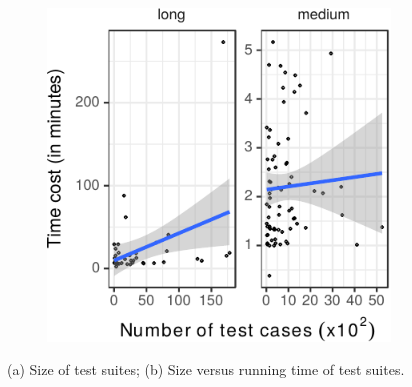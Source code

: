 \begin{center}
\begin{figure}[h!]
\begin{subfigure}{0.13\textwidth}
    \caption{\label{fig:size-testsuites}}
  \end{subfigure}
  \hspace{3ex}
  \begin{subfigure}{0.28\textwidth}
    \centering
    \includegraphics[width=.9\textwidth]{results/scatter-testcost.pdf}
    \caption{\label{fig:scattercost}}
  \end{subfigure}
  \caption{\label{fig:time-versus-size}(a) Size of test suites; (b)
    Size versus running time of test suites.}%
\end{figure}
\end{center}



